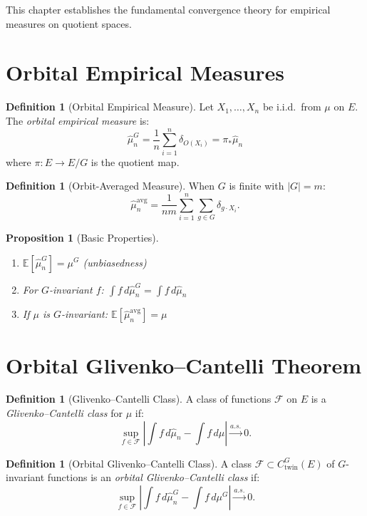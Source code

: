 \documentclass[11pt,twoside,openright]{book}
\theoremstyle{plain}
\newtheorem{proposition}[theorem]{Proposition}
\theoremstyle{definition}
\newtheorem{definition}[theorem]{Definition}
\theoremstyle{remark}
\newcommand{\calF}{\mathcal{F}}
\newcommand{\abs}[1]{|#1|}
\newcommand{\E}{\mathbb{E}}
\begin{document}
This chapter establishes the fundamental convergence theory for empirical measures on quotient spaces.

\section{Orbital Empirical Measures}

\begin{definition}[Orbital Empirical Measure]
Let $X_1, \ldots, X_n$ be i.i.d.\ from $\mu$ on $E$. The \emph{orbital empirical measure} is:
\[
\hat{\mu}_n^G = \frac{1}{n} \sum_{i=1}^n \delta_{O(X_i)} = \pi_* \hat{\mu}_n
\]
where $\pi : E \to E/G$ is the quotient map.
\end{definition}

\begin{definition}[Orbit-Averaged Measure]
When $G$ is finite with $|G| = m$:
\[
\hat{\mu}_n^{\text{avg}} = \frac{1}{nm} \sum_{i=1}^n \sum_{g \in G} \delta_{g \cdot X_i}.
\]
\end{definition}

\begin{proposition}[Basic Properties]
\begin{enumerate}[label=(\roman*)]
\item $\E[\hat{\mu}_n^G] = \mu^G$ (unbiasedness)
\item For $G$-invariant $f$: $\int f \, d\hat{\mu}_n^G = \int f \, d\hat{\mu}_n$
\item If $\mu$ is $G$-invariant: $\E[\hat{\mu}_n^{\text{avg}}] = \mu$
\end{enumerate}
\end{proposition}

\section{Orbital Glivenko--Cantelli Theorem}

\begin{definition}[Glivenko--Cantelli Class]
A class of functions $\calF$ on $E$ is a \emph{Glivenko--Cantelli class} for $\mu$ if:
\[
\sup_{f \in \calF} \abs{\int f \, d\hat{\mu}_n - \int f \, d\mu} \xrightarrow{a.s.} 0.
\]
\end{definition}

\begin{definition}[Orbital Glivenko--Cantelli Class]
A class $\calF \subset C_{\text{twin}}^G(E)$ of $G$-invariant functions is an \emph{orbital Glivenko--Cantelli class} if:
\[
\sup_{f \in \calF} \abs{\int f \, d\hat{\mu}_n^G - \int f \, d\mu^G} \xrightarrow{a.s.} 0.
\]
\end{definition}
\end{document}
